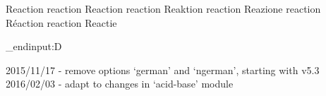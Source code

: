  {Reaction}
 {reaction} {Reaction}
  {reaction} {Reaktion}
 {reaction} {Reazione}
  {reaction} {R\'eaction}
   {reaction} {Reactie}


\tex_endinput:D

2015/11/17 - remove options `german' and `ngerman', starting with v5.3
2016/02/03 - adapt to changes in `acid-base' module
